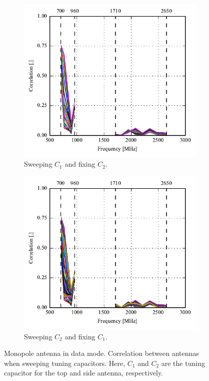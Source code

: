 \begin{figure}[htbp]
    \centering
    \begin{subfigure}{0.49\linewidth}
        \includegraphics{img/tech_sol/monopole/highband/ue/datamode/corr_top.pdf}
        \caption{Sweeping $C_1$ and fixing $C_2$.}
    \end{subfigure}
    \hfill
    \begin{subfigure}{0.49\linewidth}
        \includegraphics{img/tech_sol/monopole/highband/ue/datamode/corr_side.pdf}
        \caption{Sweeping $C_2$ and fixing $C_1$.  }
    \end{subfigure}
    \caption{Monopole antenna in data mode. Correlation between antennas when sweeping tuning capacitors. Here, $C_1$ and $C_2$ are the tuning capacitor for the top and side antenna, respectively.}
    \label{fig:corr_mono_modi_data_mode}
\end{figure}


